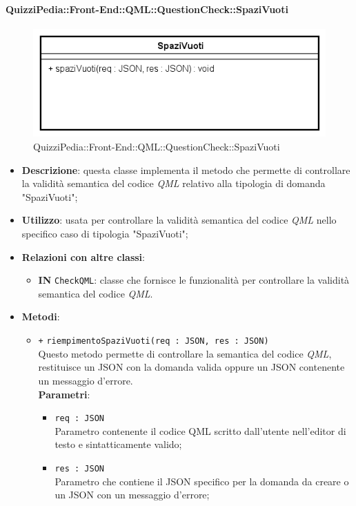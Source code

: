 \paragraph[QuizziPedia::Front-End::QML:: \\ QuestionCheck::SpaziVuoti]{QuizziPedia::Front-End::QML::QuestionCheck::SpaziVuoti}
\begin{figure} [ht]
	\centering
	\includegraphics[scale=0.32]{UML/Classi/Front-End/QuizziPedia_Front-end_QML_QuestionCheck_SpaziVuoti.png}
	\caption{QuizziPedia::Front-End::QML::QuestionCheck::SpaziVuoti}
\end{figure} \FloatBarrier
\begin{itemize}
	\item \textbf{Descrizione}: questa classe implementa il metodo che permette di controllare la validità semantica del codice \textit{QML} relativo alla tipologia di domanda "SpaziVuoti";
	\item \textbf{Utilizzo}: usata per controllare la validità semantica del codice \textit{QML} nello specifico caso di tipologia "SpaziVuoti";
	\item \textbf{Relazioni con altre classi}:
	\begin{itemize}
		\item \textbf{IN} \texttt{CheckQML}: classe che fornisce le funzionalità per controllare la validità semantica del codice \textit{QML}.
	\end{itemize}
	\item \textbf{Metodi}:
	\begin{itemize}
		\item \texttt{+} \texttt{riempimentoSpaziVuoti(req : JSON, res : JSON)} \\
		Questo metodo permette di controllare la semantica del codice \textit{QML}, restituisce un JSON con la domanda valida oppure un JSON contenente un messaggio d'errore. \\
		\textbf{Parametri}:
		\begin{itemize}
			\item \texttt{req : JSON} \\
			Parametro contenente il codice QML scritto dall'utente nell'editor di testo e sintatticamente valido;
			\item \texttt{res : JSON} \\
			Parametro che contiene il JSON specifico per la domanda da creare o un JSON con un messaggio d'errore;
		\end{itemize}
	\end{itemize}
\end{itemize}

